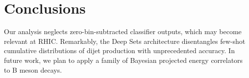 \section{Conclusions}\label{sec:conclusions}

Our analysis neglects zero-bin-subtracted classifier outputs, which may
become relevant at RHIC. Remarkably, the Deep Sets architecture
disentangles few-shot cumulative distributions of dijet production with
unprecedented accuracy. In future work, we plan to apply a family of
Bayesian projected energy correlators to B meson decays.

